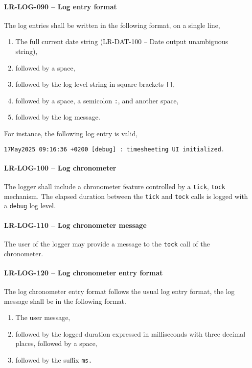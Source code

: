 \paragraph{LR-LOG-090 -- Log entry format}
The log entries shall be written in the following format,
on a single line,
\begin{enumerate}
\item The full current date string (LR-DAT-100 -- Date output unambiguous
  string),
\item followed by a space,
\item followed by the log level string in square brackets \lstinline{[]},
\item followed by a space, a semicolon \lstinline{:}, and another
  space,
\item followed by the log message.
\end{enumerate}

For instance, the following log entry is valid,
\begin{lstlisting}[numbers=none]
17May2025 09:16:36 +0200 [debug] : timesheeting UI initialized.
\end{lstlisting}

\paragraph{LR-LOG-100 -- Log chronometer}
The logger shall include a chronometer feature controlled by
a \lstinline{tick}, \lstinline{tock} mechanism.
The elapsed duration between the \lstinline{tick} and \lstinline{tock}
calls is logged with a \lstinline{debug} log level.

\paragraph{LR-LOG-110 -- Log chronometer message}
The user of the logger may provide a message to the \lstinline{tock}
call of the chronometer.

\paragraph{LR-LOG-120 -- Log chronometer entry format}
The log chronometer entry format follows the usual log entry format,
the log message shall be in the following format.
\begin{enumerate}
\item The user message,
\item followed by the logged duration expressed in milliseconds
  with three decimal places, followed by a space,
\item followed by the suffix \lstinline{ms.}
\end{enumerate}

